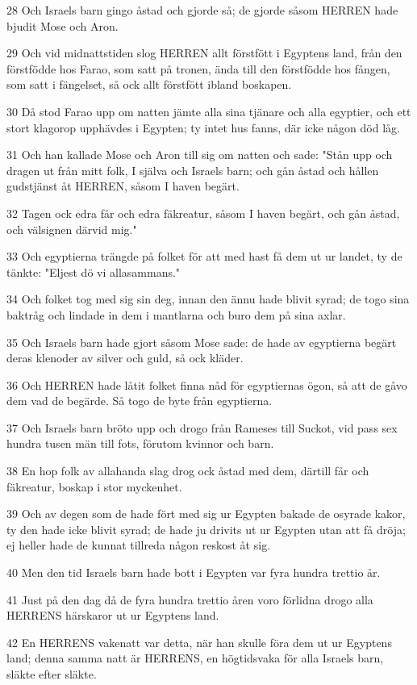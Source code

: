 \par 28 Och Israels barn gingo åstad och gjorde så; de gjorde såsom HERREN hade bjudit Mose och Aron.
\par 29 Och vid midnattstiden slog HERREN allt förstfött i Egyptens land, från den förstfödde hos Farao, som satt på tronen, ända till den förstfödde hos fången, som satt i fängelset, så ock allt förstfött ibland boskapen.
\par 30 Då stod Farao upp om natten jämte alla sina tjänare och alla egyptier, och ett stort klagorop upphävdes i Egypten; ty intet hus fanns, där icke någon död låg.
\par 31 Och han kallade Mose och Aron till sig om natten och sade: "Stån upp och dragen ut från mitt folk, I själva och Israels barn; och gån åstad och hållen gudstjänst åt HERREN, såsom I haven begärt.
\par 32 Tagen ock edra får och edra fäkreatur, såsom I haven begärt, och gån åstad, och välsignen därvid mig."
\par 33 Och egyptierna trängde på folket för att med hast få dem ut ur landet, ty de tänkte: "Eljest dö vi allasammans."
\par 34 Och folket tog med sig sin deg, innan den ännu hade blivit syrad; de togo sina baktråg och lindade in dem i mantlarna och buro dem på sina axlar.
\par 35 Och Israels barn hade gjort såsom Mose sade: de hade av egyptierna begärt deras klenoder av silver och guld, så ock kläder.
\par 36 Och HERREN hade låtit folket finna nåd för egyptiernas ögon, så att de gåvo dem vad de begärde. Så togo de byte från egyptierna.
\par 37 Och Israels barn bröto upp och drogo från Rameses till Suckot, vid pass sex hundra tusen män till fots, förutom kvinnor och barn.
\par 38 En hop folk av allahanda slag drog ock åstad med dem, därtill får och fäkreatur, boskap i stor myckenhet.
\par 39 Och av degen som de hade fört med sig ur Egypten bakade de osyrade kakor, ty den hade icke blivit syrad; de hade ju drivits ut ur Egypten utan att få dröja; ej heller hade de kunnat tillreda någon reskost åt sig.
\par 40 Men den tid Israels barn hade bott i Egypten var fyra hundra trettio år.
\par 41 Just på den dag då de fyra hundra trettio åren voro förlidna drogo alla HERRENS härskaror ut ur Egyptens land.
\par 42 En HERRENS vakenatt var detta, när han skulle föra dem ut ur Egyptens land; denna samma natt är HERRENS, en högtidsvaka för alla Israels barn, släkte efter släkte.
